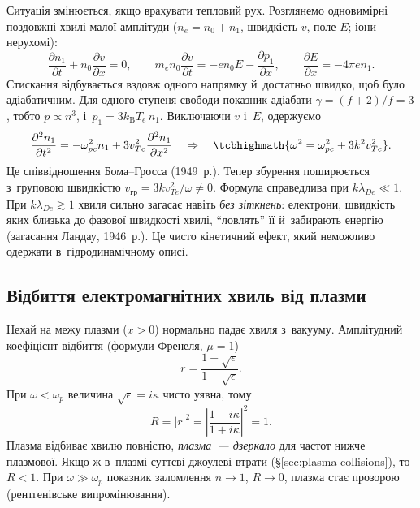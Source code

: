 Ситуація змінюється, якщо врахувати тепловий рух. Розглянемо одновимірні поздовжні хвилі
малої амплітуди ($n_e=n_0+n_1$, швидкість $v$, поле $E$; іони нерухомі):
\begin{equation*}
	\frac{\partial n_1}{\partial t}+n_0\frac{\partial v}{\partial x}=0,\qquad
	m_en_0\frac{\partial v}{\partial t}=-en_0E-\frac{\partial p_1}{\partial x},\qquad
	\frac{\partial E}{\partial x}=-4\pi en_1.
\end{equation*}
Стискання відбувається вздовж одного напрямку й~достатньо швидко, щоб було адіабатичним.
Для одного ступеня свободи показник адіабати $\gamma=(f+2)/f=3$, тобто $p\propto n^3$,
і~$p_1=3k_{\mathrm B}T_e\,n_1$. Виключаючи $v$ і~$E$, одержуємо
\begin{equation*}
	\frac{\partial^2n_1}{\partial t^2}=-\omega_{pe}^2n_1+3v_{Te}^2\frac{\partial^2n_1}{\partial x^2}
	\quad\Rightarrow\quad
	\tcbhighmath{\omega^2=\omega_{pe}^2+3k^2v_{Te}^2}.
\end{equation*}
Це співвідношення Бома--Гросса (1949~р.). Тепер збурення поширюється з~груповою швидкістю
$v_{\mathrm{гр}}=3kv_{Te}^2/\omega\neq0$. Формула справедлива при $k\lambda_{De}\ll1$. При
$k\lambda_{De}\gtrsim1$ хвиля сильно загасає навіть \emph{без зіткнень}: електрони,
швидкість яких близька до фазової швидкості хвилі, \enquote{ловлять} її й~забирають
енергію (загасання Ландау, 1946~р.). Це чисто кінетичний ефект, який неможливо одержати
в~гідродинамічному описі.


\subsection*{Відбиття електромагнітних хвиль від плазми}


Нехай на межу плазми ($x>0$) нормально падає хвиля з~вакууму. Амплітудний коефіцієнт
відбиття (формули Френеля, $\mu=1$)
\begin{equation*}
	r=\frac{1-\sqrt\epsilon}{1+\sqrt\epsilon}.
\end{equation*}
При $\omega<\omega_p$ величина $\sqrt\epsilon=i\kappa$ чисто уявна, тому
\begin{equation*}
	R=|r|^2=\left|\frac{1-i\kappa}{1+i\kappa}\right|^2=1.
\end{equation*}
Плазма відбиває хвилю повністю, \emph{плазма~--- дзеркало} для частот нижче плазмової.
Якщо ж в~плазмі суттєві джоулеві втрати (§\ref{sec:plasma-collisions}), то $R<1$. При
$\omega\gg\omega_p$ показник заломлення $n\to1$, $R\to0$, плазма стає прозорою
(рентгенівське випромінювання).

